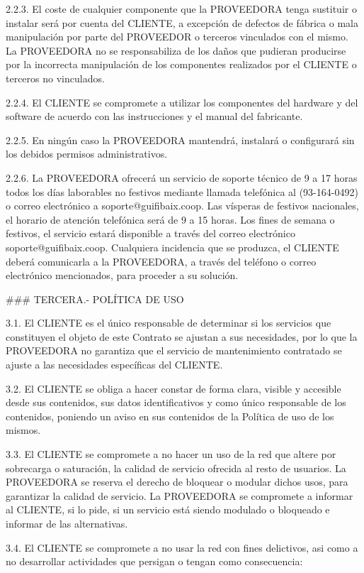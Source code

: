 2.2.3. El coste de cualquier componente que la PROVEEDORA tenga sustituir o instalar será por cuenta del CLIENTE, a excepción de defectos de fábrica o mala manipulación por parte del 
PROVEEDOR o terceros vinculados con el mismo. La PROVEEDORA no se responsabiliza de los daños que pudieran producirse por la incorrecta manipulación de los componentes realizados por el CLIENTE o terceros no vinculados.

2.2.4. El CLIENTE se compromete a utilizar los componentes del hardware y del software de acuerdo con las instrucciones y el manual del fabricante.

2.2.5. En ningún caso la PROVEEDORA mantendrá, instalará o configurará sin los debidos permisos administrativos.

2.2.6. La PROVEEDORA ofrecerá un servicio de soporte técnico de 9 a 17 horas todos los días laborables no festivos mediante llamada telefónica al (93-164-0492) o correo electrónico a 
soporte@guifibaix.coop. Las vísperas de festivos nacionales, el horario de atención telefónica será de 9 a 15 horas. Los fines de semana o festivos, el servicio estará disponible a través del 
correo electrónico soporte@guifibaix.coop. Cualquiera incidencia que se produzca, el CLIENTE deberá comunicarla a la PROVEEDORA, a través del teléfono o correo electrónico mencionados, para proceder a su solución. 



### TERCERA.- POLÍTICA DE USO

3.1.
	El CLIENTE es el único responsable de determinar
	si los servicios que constituyen el objeto de este Contrato
	se ajustan a sus necesidades,
	por lo que la PROVEEDORA no garantiza que el servicio de mantenimiento contratado
	se ajuste a las necesidades específicas del CLIENTE.

3.2.
	El CLIENTE se obliga a hacer constar de forma clara, visible y accesible desde sus contenidos,
	sus datos identificativos y como único responsable de los contenidos,
	poniendo un aviso en sus contenidos de la Política de uso de los mismos.

3.3.
	El CLIENTE se compromete a no hacer un uso de la red que altere por sobrecarga o saturación,
	la calidad de servicio ofrecida al resto de usuarios.
	La PROVEEDORA se reserva el derecho de bloquear o modular dichos usos, para garantizar la calidad de servicio.
	La PROVEEDORA se compromete a informar al CLIENTE, si lo pide,
	si un servicio está siendo  modulado o bloqueado e informar de las alternativas.

3.4.
	El CLIENTE se compromete
	a no usar la red con fines delictivos, asi como a no desarrollar actividades que persigan o tengan como consecuencia:

